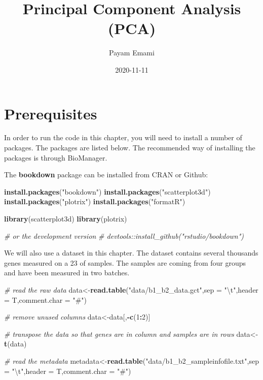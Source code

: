 \documentclass[
]{book}
\title{Principal Component Analysis (PCA)}
\author{Payam Emami}
\date{2020-11-11}
\newenvironment{Shaded}{\begin{snugshade}}{\end{snugshade}}
\newcommand{\CharTok}[1]{\textcolor[rgb]{0.31,0.60,0.02}{#1}}
\newcommand{\CommentTok}[1]{\textcolor[rgb]{0.56,0.35,0.01}{\textit{#1}}}
\newcommand{\DataTypeTok}[1]{\textcolor[rgb]{0.13,0.29,0.53}{#1}}
\newcommand{\DecValTok}[1]{\textcolor[rgb]{0.00,0.00,0.81}{#1}}
\newcommand{\KeywordTok}[1]{\textcolor[rgb]{0.13,0.29,0.53}{\textbf{#1}}}
\newcommand{\NormalTok}[1]{#1}
\newcommand{\OperatorTok}[1]{\textcolor[rgb]{0.81,0.36,0.00}{\textbf{#1}}}
\newcommand{\StringTok}[1]{\textcolor[rgb]{0.31,0.60,0.02}{#1}}
\theoremstyle{definition}
\theoremstyle{definition}
\theoremstyle{definition}
\theoremstyle{remark}
\begin{document}
\maketitle

{
\setcounter{tocdepth}{1}
\tableofcontents
}
\hypertarget{prerequisites}{%
\chapter{Prerequisites}\label{prerequisites}}

In order to run the code in this chapter, you will need to install a number of packages. The packages are listed below. The recommended way of installing the packages is through BioManager.

The \textbf{bookdown} package can be installed from CRAN or Github:

\begin{Shaded}
\begin{Highlighting}[]
\KeywordTok{install.packages}\NormalTok{(}\StringTok{"bookdown"}\NormalTok{)}
\KeywordTok{install.packages}\NormalTok{(}\StringTok{"scatterplot3d"}\NormalTok{)}
\KeywordTok{install.packages}\NormalTok{(}\StringTok{"plotrix"}\NormalTok{)}
\KeywordTok{install.packages}\NormalTok{(}\StringTok{"formatR"}\NormalTok{)}

\KeywordTok{library}\NormalTok{(scatterplot3d)}
\KeywordTok{library}\NormalTok{(plotrix)}

\CommentTok{# or the development version}
\CommentTok{# devtools::install_github("rstudio/bookdown")}
\end{Highlighting}
\end{Shaded}

We will also use a dataset in this chapter. The dataset contains several thousands genes measured on a 23 of samples. The samples are coming from four groups and have been measured in two batches.

\begin{Shaded}
\begin{Highlighting}[]
\CommentTok{# read the raw data}
\NormalTok{data<-}\KeywordTok{read.table}\NormalTok{(}\StringTok{"data/b1_b2_data.gct"}\NormalTok{,}\DataTypeTok{sep =} \StringTok{"}\CharTok{\textbackslash{}t}\StringTok{"}\NormalTok{,}\DataTypeTok{header =}\NormalTok{ T,}\DataTypeTok{comment.char =} \StringTok{"#"}\NormalTok{)}

\CommentTok{# remove unused columns }
\NormalTok{data<-data[,}\OperatorTok{-}\KeywordTok{c}\NormalTok{(}\DecValTok{1}\OperatorTok{:}\DecValTok{2}\NormalTok{)]}

\CommentTok{# transpose the data so that genes are in column and samples are in rows}
\NormalTok{data<-}\KeywordTok{t}\NormalTok{(data)}

\CommentTok{# read the metadata}
\NormalTok{metadata<-}\KeywordTok{read.table}\NormalTok{(}\StringTok{"data/b1_b2_sampleinfofile.txt"}\NormalTok{,}\DataTypeTok{sep =} \StringTok{"}\CharTok{\textbackslash{}t}\StringTok{"}\NormalTok{,}\DataTypeTok{header =}\NormalTok{ T,}\DataTypeTok{comment.char =} \StringTok{"#"}\NormalTok{)}
\end{Highlighting}
\end{Shaded}
\end{document}
